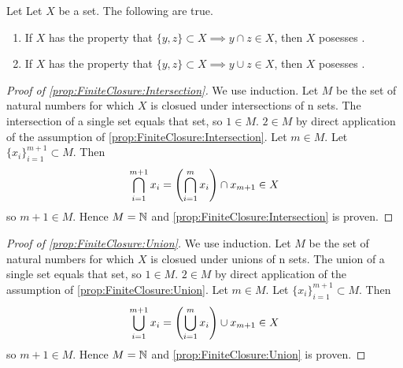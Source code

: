 \begin{prop}
\label{prop:FiniteClosure}
\rm
    Let Let $X$ be a set. 
    The following are true. 
    \begin{enumerate}[label=(\roman*), ref={\ref{prop:FiniteClosure}.~\roman*}]
        \item \label{prop:FiniteClosure:Intersection}If $X$ has the property that $\{y,z\} \subset X \implies y \cap z \in X$, then $X$ 
        posesses \ClosureUnderFiniteIntersections. 
        \item \label{prop:FiniteClosure:Union}If $X$ has the property that $\{y,z\} \subset X \implies y \cup z \in X$, then $X$ posesses 
        \ClosureUnderFiniteUnions.
    \end{enumerate}
    \begin{proof}[Proof of \ref{prop:FiniteClosure:Intersection}]
        We use induction.
        Let $M$ be the set of natural numbers for which
        $X$ is closued under intersections of n sets. 
        The intersection of a single set equals that set, so $1 \in M$. 
        $2 \in M$ by direct application of the assumption of 
        \ref{prop:FiniteClosure:Intersection}. 
        Let $m \in M$. Let $\{x_i\}_{i=1}^{m+1} \subset M$. 
        Then 
        \begin{equation*}
            \bigcap\limits_{i=1}^{m+1} x_i = \left(  \bigcap\limits_{i=1}^m x_i\right) \cap x_{m+1} \in X
        \end{equation*}
        so $m+1 \in M$. 
        Hence $M= \mathbb{N}$ and \ref{prop:FiniteClosure:Intersection} is proven. 
    \end{proof}
    \begin{proof}[Proof of \ref{prop:FiniteClosure:Union}]
         We use induction.
        Let $M$ be the set of natural numbers for which
        $X$ is closued under unions of n sets. 
        The union of a single set equals that set, so $1 \in M$. 
        $2 \in M$ by direct application of the assumption of 
        \ref{prop:FiniteClosure:Union}. 
        Let $m \in M$. Let $\{x_i\}_{i=1}^{m+1} \subset M$. 
        Then 
        \begin{equation*}
            \bigcup\limits_{i=1}^{m+1} x_i = \left(  \bigcup\limits_{i=1}^m x_i\right) \cup x_{m+1} \in X
        \end{equation*}
        so $m+1 \in M$. 
        Hence $M= \mathbb{N}$ and \ref{prop:FiniteClosure:Union} is proven. 
    \end{proof}
\end{prop}
